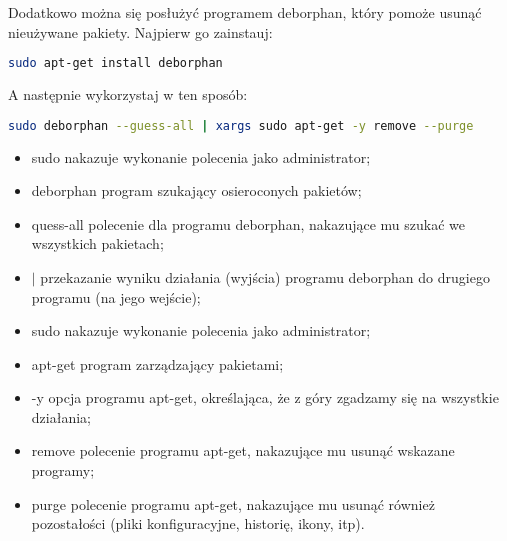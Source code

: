 Dodatkowo można się posłużyć programem \textcolor{ubuntu_orange}{deborphan}, który pomoże usunąć nieużywane pakiety. Najpierw go zainstauj:
\begin{lstlisting}[language=bash]
sudo apt-get install deborphan
\end{lstlisting}
A następnie wykorzystaj w ten sposób:
\begin{lstlisting}[language=bash]
sudo deborphan --guess-all | xargs sudo apt-get -y remove --purge
\end{lstlisting}
\begin{itemize}
\item \textcolor{ubuntu_orange}{sudo} nakazuje wykonanie polecenia jako administrator;
\item \textcolor{ubuntu_orange}{deborphan} program szukający osieroconych pakietów;
\item \textcolor{ubuntu_orange}{\-\-quess-all} polecenie dla programu deborphan, nakazujące mu szukać we wszystkich pakietach;
\item \textcolor{ubuntu_orange}{$\vert$} przekazanie wyniku działania (wyjścia) programu deborphan do drugiego programu (na jego wejście);
\item \textcolor{ubuntu_orange}{sudo} nakazuje wykonanie polecenia jako administrator;
\item \textcolor{ubuntu_orange}{apt-get} program zarządzający pakietami;
\item \textcolor{ubuntu_orange}{-y} opcja programu apt-get, określająca, że z góry zgadzamy się na wszystkie działania;
\item \textcolor{ubuntu_orange}{remove} polecenie programu apt-get, nakazujące mu usunąć wskazane programy;
\item \textcolor{ubuntu_orange}{\-\-purge} polecenie programu apt-get, nakazujące mu usunąć również pozostałości (pliki konfiguracyjne, historię, ikony, itp).
\end{itemize}
